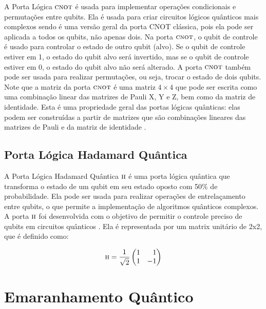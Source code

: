 A Porta Lógica \(\operatorname{\textsc{cnot}}\) é usada para implementar operações condicionais e permutações entre qubits. Ela é usada para criar circuitos lógicos quânticos mais complexos sendo é uma versão geral da porta CNOT clássica, pois ela pode ser aplicada a todos os qubits, não apenas dois. Na porta \(\operatorname{\textsc{cnot}}\), o qubit de controle é usado para controlar o estado de outro qubit (alvo). Se o qubit de controle estiver em 1, o estado do qubit alvo será invertido, mas se o qubit de controle estiver em 0, o estado do qubit alvo não será alterado. A porta \(\operatorname{\textsc{cnot}}\) também pode ser usada para realizar permutações, ou seja, trocar o estado de dois qubits.
Note que a matriz da porta \(\operatorname{\textsc{cnot}}\) é uma matriz $4 \times 4$ que pode ser escrita como uma combinação linear das matrizes de Pauli X, Y e Z, bem como da matriz de identidade. Esta é uma propriedade geral das portas lógicas quânticas: elas podem ser construídas a partir de matrizes que são combinações lineares das matrizes de Pauli e da matriz de identidade \cite{chuang}.

\subsection{Porta Lógica Hadamard Quântica}\label{sec:had}

A Porta Lógica Hadamard Quântica \(\operatorname{\textsc{h}}\) é uma porta lógica quântica que transforma o estado de um qubit em seu estado oposto com 50\% de probabilidade. Ela pode ser usada para realizar operações de entrelaçamento entre qubits, o que permite a implementação de algoritmos quânticos complexos. A porta \(\operatorname{\textsc{h}}\) foi desenvolvida com o objetivo de permitir o controle preciso de qubits em circuitos quânticos \cite{jorcuvich}. Ela é representada por um matrix unitário de 2x2, que é definido como:

\begin{equation}
\HAD= \frac{1}{\sqrt{2}} \begin{pmatrix*}[r]
1 & 1 \\
1 & -1
\end{pmatrix*}
\end{equation}


\section{Emaranhamento Quântico}

